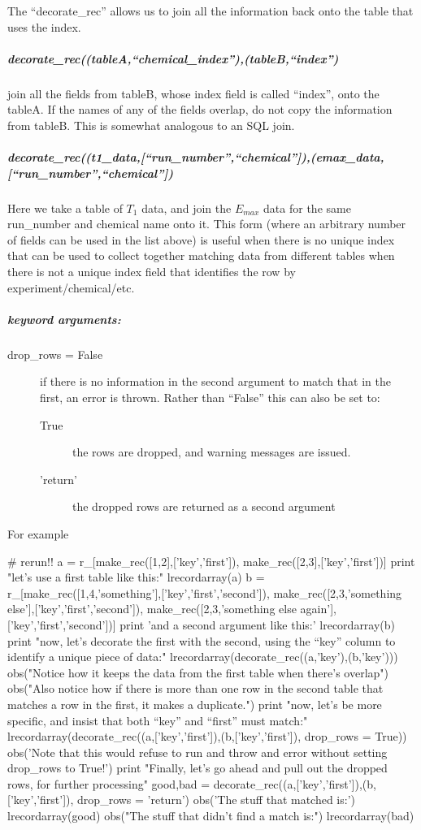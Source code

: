 The ``decorate\_rec'' allows us to join all the information back onto the table
    that uses the index.

\subparagraph{decorate\_rec((tableA,``chemical\_index''),(tableB,``index'')}
join all the fields from tableB, whose index field is called ``index'',
    onto the tableA.
If the names of any of the fields overlap, do not copy the information from
    tableB.
This is somewhat analogous to an SQL join.

\subparagraph{decorate\_rec((t1\_data,[``run\_number'',``chemical'']),(emax\_data,[``run\_number'',``chemical''])}
Here we take a table of $T_1$ data, and join the $E_{max}$ data for the same run\_number
    and chemical name onto it.
This form (where an arbitrary number of fields can be used in the list above)
    is useful when there is no unique index that can be used to
    collect together matching data from different tables
    when there is not a unique index field that identifies
    the row by experiment/chemical/etc.
\subparagraph{keyword arguments:}
\begin{description}
    \item[drop\_rows = False] if there is no information in the second argument to match that in the first, an error is thrown.  Rather than ``False'' this can also be set to:
        \begin{description}
            \item[True] the rows are dropped, and warning messages are issued.
            \item['return'] the dropped rows are returned as a second argument
        \end{description}
\end{description}

For example
\begin{python}
# rerun!!
a = r_[make_rec([1,2],['key','first']),
    make_rec([2,3],['key','first'])]
print "let's use a first table like this:"
lrecordarray(a)
b = r_[make_rec([1,4,'something'],['key','first','second']),
    make_rec([2,3,'something else'],['key','first','second']),
    make_rec([2,3,'something else again'],['key','first','second'])]
print 'and a second argument like this:'
lrecordarray(b)
print "now, let's decorate the first with the second, using the ``key'' column to identify a unique piece of data:"
lrecordarray(decorate_rec((a,'key'),(b,'key')))
obs("Notice how it keeps the data from the first table when there's overlap\n\n")
obs("Also notice how if there is more than one row in the second table that matches a row in the first, it makes a duplicate.")
print "now, let's be more specific, and insist that both ``key'' and ``first'' must match:"
lrecordarray(decorate_rec((a,['key','first']),(b,['key','first']),
    drop_rows = True))
obs('Note that this would refuse to run and throw and error without setting drop\_rows to True!')
print "Finally, let's go ahead and pull out the dropped rows, for further processing" 
good,bad = decorate_rec((a,['key','first']),(b,['key','first']),
    drop_rows = 'return')
obs('The stuff that matched is:')
lrecordarray(good)
obs("The stuff that didn't find a match is:")
lrecordarray(bad)
\end{python}
